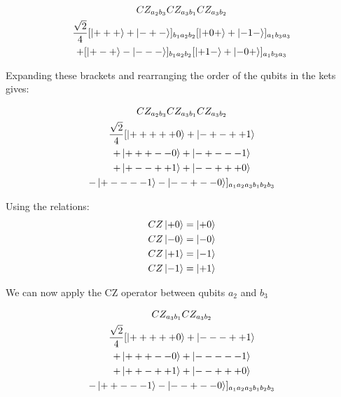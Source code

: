\begin{multline*}
CZ _{a_{2} b_{3}} CZ _{a_{3} b_{1}} CZ _{a_{3} b_{2}} \\
\frac{\sqrt{2}}{4}
  [\ket{+ + +} + \ket{- + -}] _{b_{1} a_{2} b_{2}} [\ket{+ 0 +} + \ket{- 1 -}] _{a_{1} b_{3} a_{3}} \\
+ [\ket{+ - +} - \ket{- - -}] _{b_{1} a_{2} b_{2}} [\ket{+ 1 -} + \ket{- 0 +}] _{a_{1} b_{3} a_{3}} \\
\end{multline*}

Expanding these brackets and rearranging the order of the qubits in the kets gives:

\begin{multline*}
CZ _{a_{2} b_{3}} CZ _{a_{3} b_{1}} CZ _{a_{3} b_{2}} \\
\frac{\sqrt{2}}{4}
  [\ket{+ + + + + 0} + \ket{- + - + + 1} \\
  + \ket{+ + + - - 0} + \ket{- + - - - 1} \\
 + \ket{+ - - + + 1} + \ket{- - + + + 0} \\
 - \ket{+ - - - - 1} - \ket{- - + - - 0}] _{a_{1} a_{2} a_{3} b_{1} b_{2} b_{3}} \\
\end{multline*}


Using the relations:
\begin{align*}
CZ \ket{+ 0} = \ket {+ 0} \\
CZ \ket{- 0} = \ket {- 0} \\
CZ \ket{+ 1} = \ket {- 1} \\
CZ \ket{- 1} = \ket {+ 1} \\
\end{align*}

We can now apply the CZ operator between qubits $a_{2}$ and $b_{3}$

\begin{multline*}
CZ _{a_{3} b_{1}} CZ _{a_{3} b_{2}} \\
\frac{\sqrt{2}}{4}
  [\ket{+ + + + + 0} + \ket{- - - + + 1} \\
  + \ket{+ + + - - 0} + \ket{- - - - - 1} \\
 + \ket{+ + - + + 1} + \ket{- - + + + 0} \\
 - \ket{+ + - - - 1} - \ket{- - + - - 0}] _{a_{1} a_{2} a_{3} b_{1} b_{2} b_{3}} \\
\end{multline*}



